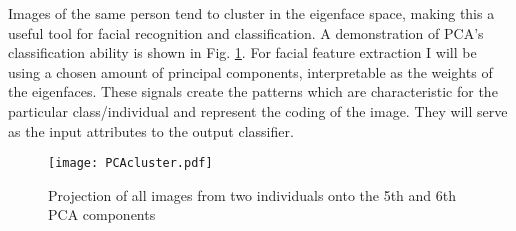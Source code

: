 Images of the same person tend to cluster in the eigenface space, making this a
useful tool for facial recognition and classification. A demonstration of PCA's
classification ability is shown in Fig. \ref{cluster}. For facial feature
extraction I will be using a chosen amount of principal components,
interpretable as the weights of the eigenfaces. These signals create the
patterns which are characteristic for the particular class/individual and
represent the coding of the image. They will serve as the input attributes to
the output classifier.

\begin{figure}[ht]
  \centering
  \texttt{[image: PCAcluster.pdf]}
  \caption{Projection of all images from two individuals onto the 5th and 6th 
  PCA components}
  \label{cluster}
\end{figure}
